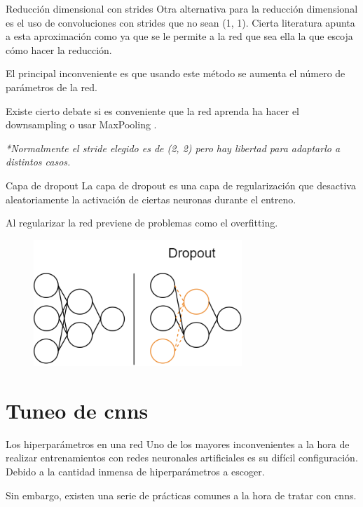 \begin{frame}{Reducción dimensional con strides}
Otra \alert{alternativa} para la reducción dimensional es el uso de convoluciones con \alert{strides} que no sean (1, 1). Cierta literatura apunta a esta aproximación como  ya que se le permite a la \alert{red} que sea ella la que escoja \alert{cómo hacer} la reducción.

El principal \alert{inconveniente} es que usando este método se aumenta el número de parámetros de la red.

Existe cierto debate si es conveniente que la red \alert{aprenda} ha hacer el downsampling \cite{MaxPoolingvsStrides} o usar MaxPooling \cite{sun2018fishnet}.

\textit{*Normalmente el stride elegido es de (2, 2) pero hay libertad para adaptarlo a distintos casos.}
\end{frame}

\begin{frame}{Capa de dropout}
La capa de \alert{dropout} es una capa de \alert{regularización} que \alert{desactiva aleatoriamente} la activación de ciertas \alert{neuronas} durante el entreno.

Al regularizar la red previene de problemas como el \alert{overfitting}.

\begin{figure}
    \centering
    \includegraphics[width=0.7\textwidth]{figures/Tema 3/Dropout.png}
\end{figure}
\end{frame}

\section{Tuneo de \glspl{cnn}}

\begin{frame}{Los hiperparámetros en una red}
Uno de los mayores \alert{inconvenientes} a la hora de realizar entrenamientos con redes neuronales artificiales es su \alert{difícil configuración}. Debido a la cantidad inmensa de \alert{hiperparámetros} a escoger.

Sin embargo, existen una serie de \alert{prácticas comunes} a la hora de tratar con \glspl{cnn}.
\end{frame}

